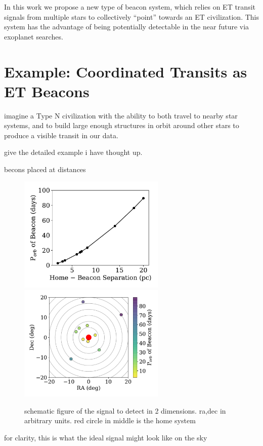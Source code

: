 \documentclass[modern]{aastex62}
\begin{document}
In this work we propose a new type of beacon system, which relies on ET transit signals from multiple stars to collectively ``point'' towards an ET civilization. This system has the advantage of being potentially detectable in the near future via exoplanet searches.




\section{Example: Coordinated Transits as ET Beacons}
imagine a Type N civilization with the ability to both travel to nearby star systems, and to build large enough structures in orbit around other stars to produce a visible transit in our data.

give the detailed example i have thought up.

becons placed at distances


\begin{figure}[]
\centering
\includegraphics[width=2.75in]{../figures/dist_per.pdf}
\includegraphics[width=2.75in]{../figures/sky_per.pdf}
\caption{schematic figure of the signal to detect in 2 dimensions. ra,dec in arbitrary units. red circle in middle is the home system}
\label{fig:2d}
\end{figure}


for clarity, this is what the ideal signal might look like on the sky
\end{document}
